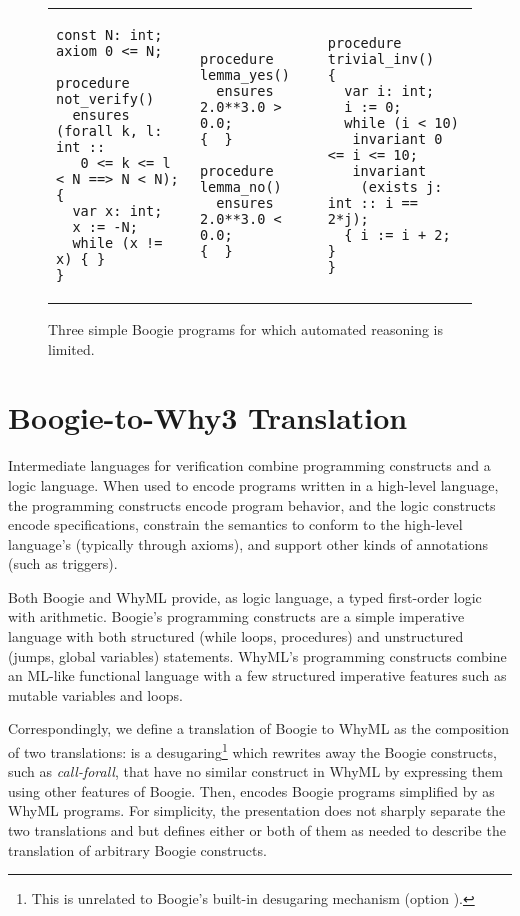 \documentclass[a4paper,final]{llncs}
\newif\iflong
\newcommand{\Boogie}{Boogie\xspace}
\newcommand{\WhyML}{WhyML\xspace}
\begin{document}
\begin{figure}[!thb]
\centering
\scriptsize
\lstset{language=boogie}
\begin{tabular}{p{} p{} p{}}
{\begin{lstlisting}
const N: int;
axiom 0 <= N;

procedure not_verify()
  ensures (forall k, l: int :: 
   0 <= k <= l < N ==> N < N);
{
  var x: int;
  x := -N;
  while (x != x) { }
}\end{lstlisting}}
&
{\begin{lstlisting}
procedure lemma_yes()
  ensures 2.0**3.0 > 0.0;
{  }

procedure lemma_no()
  ensures 2.0**3.0 < 0.0;
{  }\end{lstlisting}}
&
{\begin{lstlisting}
procedure trivial_inv()
{
  var i: int;
  i := 0;
  while (i < 10)
   invariant 0 <= i <= 10;
   invariant 
    (exists j: int :: i == 2*j);
  { i := i + 2; }
}\end{lstlisting}}
\end{tabular}
\caption{Three simple \Boogie programs for which automated reasoning is limited.}
\label{fig:motivating-examples}
\end{figure}
  




\section{Boogie-to-Why3 Translation}\label{sec:translation}

Intermediate languages for verification combine programming constructs and a logic language.
When used to encode programs written in a high-level language, the programming constructs encode program behavior, and the logic constructs encode specifications, constrain the semantics to conform to the high-level language's (typically through axioms), and support other kinds of annotations (such as triggers).

Both \Boogie and \WhyML provide, as logic language, a typed first-order logic with arithmetic.
\Boogie's programming constructs are a simple imperative language with both structured (while loops, procedures) and unstructured (jumps, global variables) statements.
\WhyML's programming constructs combine an ML-like functional language with a few structured imperative features such as mutable variables and loops.

Correspondingly, we define a translation  of \Boogie to \WhyML as the composition  of two translations:  is a desugaring\footnote{This is unrelated to \Boogie's built-in desugaring mechanism (option ).} which rewrites away the \Boogie constructs, such as \emph{call-forall}, that have no similar construct in \WhyML by expressing them using other features of \Boogie.
Then,  encodes \Boogie programs simplified by  as \WhyML programs\iflong, while introducing constraints that ensure that the semantics in \WhyML mirrors the one in \Boogie\fi.
For simplicity, the presentation does not sharply separate the two translations  and  but defines either or both of them as needed to describe the translation of arbitrary \Boogie constructs.
\end{document}
